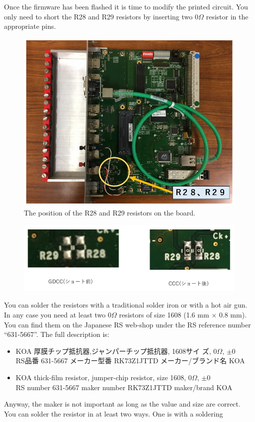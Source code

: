 Once the firmware has been flashed it is time to modify the printed circuit. You
only need to short the R28 and R29 resistors by inserting two $0\Omega$ resistor
in the appropriate pins.
\begin{figure}[ht]
  \centering \includegraphics[width=0.5\linewidth,frame]{GDCC-CCC1}
  \caption{The position of the R28 and R29 resistors on the board.}
\end{figure}
\begin{figure}[ht]
  \centering \includegraphics[width=0.8\linewidth]{GDCC-CCC2}
\end{figure}
You can solder the resistors with a traditional solder iron or with a hot air
gun. In any case you need at least two $0\Omega$ resistors of size 1608 (1.6 mm
× 0.8 mm). You can find them on the Japanese RS web-shop under the RS reference
number ``631-5667''. The full description is:
\begin{itemize}
\item \begin{CJK}{UTF8}{min}KOA 厚膜チップ抵抗器,ジャンパーチップ抵抗器, 1608サイ
    ズ, $0\Omega$, $\pm
    0$ \\
    RS品番 631-5667 メーカー型番 RK73Z1JTTD メーカー/ブランド名 KOA\end{CJK}
\item KOA thick-film resistor, jumper-chip resistor, size 1608, $0\Omega$, $\pm
  0$ \\
  RS number 631-5667 maker number RK73Z1JTTD maker/brand KOA
\end{itemize}
Anyway, the maker is not important as long as the value and size are correct.
You can solder the resistor in at least two ways. One is with a soldering
